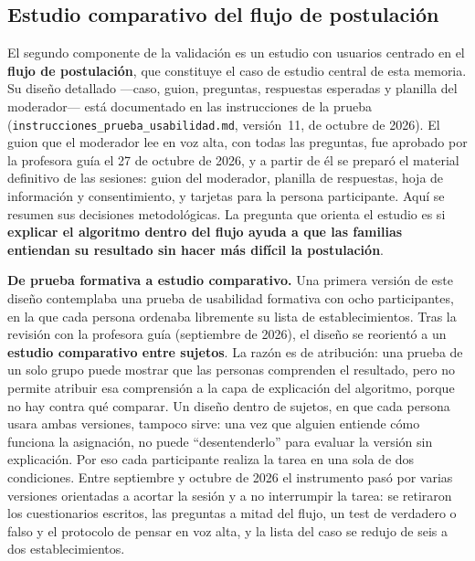 \subsection{Estudio comparativo del flujo de postulación}\label{sec:estudio-comparativo}

El segundo componente de la validación es un estudio con usuarios centrado en el \textbf{flujo de postulación}, que constituye el caso de estudio central de esta memoria. Su diseño detallado ---caso, guion, preguntas, respuestas esperadas y planilla del moderador--- está documentado en las instrucciones de la prueba (\texttt{instrucciones\_prueba\_usabilidad.md}, versión~11, de octubre de 2026). El guion que el moderador lee en voz alta, con todas las preguntas, fue aprobado por la profesora guía el 27 de octubre de 2026, y a partir de él se preparó el material definitivo de las sesiones: guion del moderador, planilla de respuestas, hoja de información y consentimiento, y tarjetas para la persona participante. Aquí se resumen sus decisiones metodológicas. La pregunta que orienta el estudio es si \textbf{explicar el algoritmo dentro del flujo ayuda a que las familias entiendan su resultado sin hacer más difícil la postulación}.

\textbf{De prueba formativa a estudio comparativo.} Una primera versión de este diseño contemplaba una prueba de usabilidad formativa con ocho participantes, en la que cada persona ordenaba libremente su lista de establecimientos. Tras la revisión con la profesora guía (septiembre de 2026), el diseño se reorientó a un \textbf{estudio comparativo entre sujetos}. La razón es de atribución: una prueba de un solo grupo puede mostrar que las personas comprenden el resultado, pero no permite atribuir esa comprensión a la capa de explicación del algoritmo, porque no hay contra qué comparar. Un diseño dentro de sujetos, en que cada persona usara ambas versiones, tampoco sirve: una vez que alguien entiende cómo funciona la asignación, no puede ``desentenderlo'' para evaluar la versión sin explicación. Por eso cada participante realiza la tarea en una sola de dos condiciones. Entre septiembre y octubre de 2026 el instrumento pasó por varias versiones orientadas a acortar la sesión y a no interrumpir la tarea: se retiraron los cuestionarios escritos, las preguntas a mitad del flujo, un test de verdadero o falso y el protocolo de pensar en voz alta, y la lista del caso se redujo de seis a dos establecimientos.

